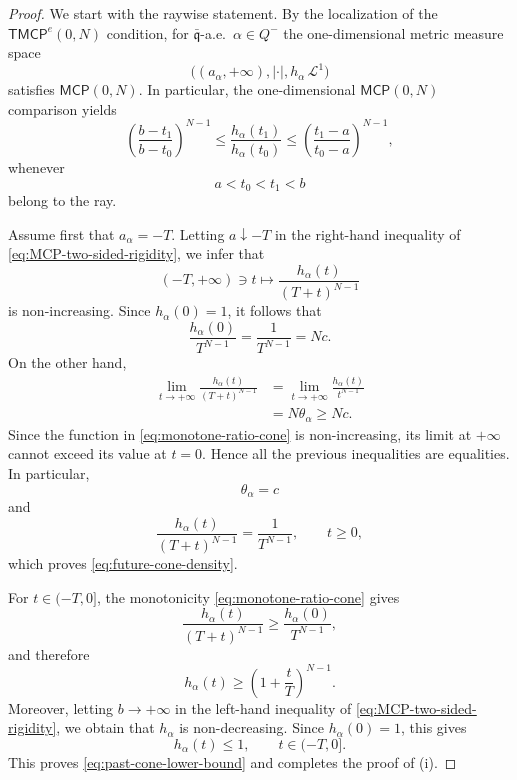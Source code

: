 \documentclass[a4paper,10pt]{article}
\newcommand{\qq}{\mathfrak q}
\theoremstyle{plain}
\theoremstyle{definition}
\numberwithin{equation}{section}
\begin{document}
\begin{proof}
We start with the raywise statement. By the localization of the
$\mathsf{TMCP}^e(0,N)$ condition, for $\bar{\qq}$-a.e.\
$\alpha\in Q^-$ the one-dimensional metric measure space
\[
    \bigl((a_\alpha,+\infty),|\cdot|,
    h_\alpha\,\mathcal L^1\bigr)
\]
satisfies $\mathsf{MCP}(0,N)$. In particular, the one-dimensional
$\mathsf{MCP}(0,N)$ comparison yields
\begin{equation}\label{eq:MCP-two-sided-rigidity}
    \left(\frac{b-t_1}{b-t_0}\right)^{N-1}
    \leq
    \frac{h_\alpha(t_1)}{h_\alpha(t_0)}
    \leq
    \left(\frac{t_1-a}{t_0-a}\right)^{N-1},
\end{equation}
whenever
\[
    a<t_0<t_1<b
\]
belong to the ray.

Assume first that $a_\alpha=-T$. Letting $a\downarrow-T$ in the
right-hand inequality of \eqref{eq:MCP-two-sided-rigidity}, we infer
that
\begin{equation}\label{eq:monotone-ratio-cone}
    (-T,+\infty)\ni t
    \longmapsto
    \frac{h_\alpha(t)}{(T+t)^{N-1}}
\end{equation}
is non-increasing. Since $h_\alpha(0)=1$, it follows that
\begin{equation}\label{eq:ratio-at-zero}
    \frac{h_\alpha(0)}{T^{N-1}}
    =
    \frac1{T^{N-1}}
    =
    Nc.
\end{equation}
On the other hand,
\begin{align*}
    \lim_{t\to+\infty}
    \frac{h_\alpha(t)}{(T+t)^{N-1}}
    &=
    \lim_{t\to+\infty}
    \frac{h_\alpha(t)}{t^{N-1}}\\
    &=
    N\theta_\alpha
    \geq Nc.
\end{align*}
Since the function in \eqref{eq:monotone-ratio-cone} is
non-increasing, its limit at $+\infty$ cannot exceed its value at
$t=0$. Hence all the previous inequalities are equalities. In
particular,
\[
    \theta_\alpha=c
\]
and
\[
    \frac{h_\alpha(t)}{(T+t)^{N-1}}
    =
    \frac1{T^{N-1}},
    \qquad t\geq0,
\]
which proves \eqref{eq:future-cone-density}.

For $t\in(-T,0]$, the monotonicity
\eqref{eq:monotone-ratio-cone} gives
\[
    \frac{h_\alpha(t)}{(T+t)^{N-1}}
    \geq
    \frac{h_\alpha(0)}{T^{N-1}},
\]
and therefore
\[
    h_\alpha(t)
    \geq
    \left(1+\frac{t}{T}\right)^{N-1}.
\]
Moreover, letting $b\to+\infty$ in the left-hand inequality of
\eqref{eq:MCP-two-sided-rigidity}, we obtain that $h_\alpha$ is
non-decreasing. Since $h_\alpha(0)=1$, this gives
\[
    h_\alpha(t)\leq1,
    \qquad t\in(-T,0].
\]
This proves \eqref{eq:past-cone-lower-bound} and completes the proof of
{\rm (i)}.


\end{proof}
\end{document}
